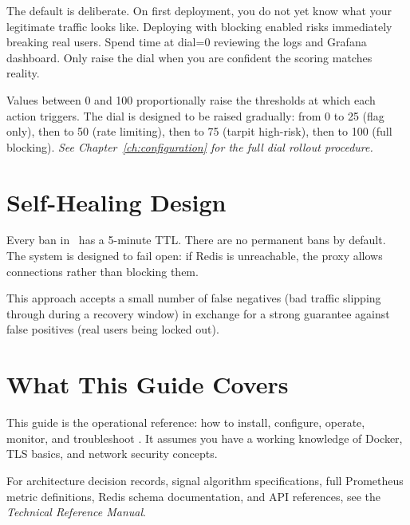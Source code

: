 \begin{importantbox}
The default  is deliberate. On first deployment, you do not yet know
what your legitimate traffic looks like. Deploying with blocking enabled risks
immediately breaking real users. Spend time at dial=0 reviewing the logs and Grafana
dashboard. Only raise the dial when you are confident the scoring matches reality.
\end{importantbox}

Values between 0 and 100 proportionally raise the thresholds at which each action
triggers. The dial is designed to be raised gradually: from 0 to 25 (flag only),
then to 50 (rate limiting), then to 75 (tarpit high-risk), then to 100 (full blocking).
\emph{See Chapter~\ref{ch:configuration} for the full dial rollout procedure.}

\section{Self-Healing Design}

Every ban in \ja\ has a 5-minute TTL.
There are no permanent bans by default. The system is designed to fail open: if
Redis is unreachable, the proxy allows connections rather than blocking them.

This approach accepts a small number of false negatives (bad traffic slipping through
during a recovery window) in exchange for a strong guarantee against false positives
(real users being locked out).

\section{What This Guide Covers}

This guide is the operational reference: how to install, configure, operate, monitor,
and troubleshoot \ja. It assumes you have a working knowledge of Docker, TLS basics,
and network security concepts.

For architecture decision records, signal algorithm specifications, full Prometheus
metric definitions, Redis schema documentation, and API references, see the
\emph{Technical Reference Manual}.
